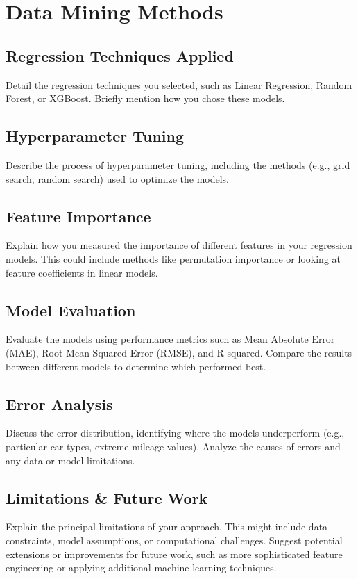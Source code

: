 \documentclass[conference]{IEEEtran}
\begin{document}
\section{Data Mining Methods}
\label{sec:data_mining_methods}

\subsection{Regression Techniques Applied}
Detail the regression techniques you selected, such as Linear Regression, Random Forest, or XGBoost. Briefly mention how you chose these models.

\subsection{Hyperparameter Tuning}
Describe the process of hyperparameter tuning, including the methods (e.g., grid search, random search) used to optimize the models.

\subsection{Feature Importance}
Explain how you measured the importance of different features in your regression models. This could include methods like permutation importance or looking at feature coefficients in linear models.

\subsection{Model Evaluation}
\label{subsec:model_evaluation}
Evaluate the models using performance metrics such as Mean Absolute Error (MAE), Root Mean Squared Error (RMSE), and R-squared. Compare the results between different models to determine which performed best.

\subsection{Error Analysis}
\label{subsec:error_analysis}
Discuss the error distribution, identifying where the models underperform (e.g., particular car types, extreme mileage values). Analyze the causes of errors and any data or model limitations.

\subsection{Limitations \& Future Work}
\label{subsec:limitations}
Explain the principal limitations of your approach. This might include data constraints, model assumptions, or computational challenges. Suggest potential extensions or improvements for future work, such as more sophisticated feature engineering or applying additional machine learning techniques.
\end{document}
